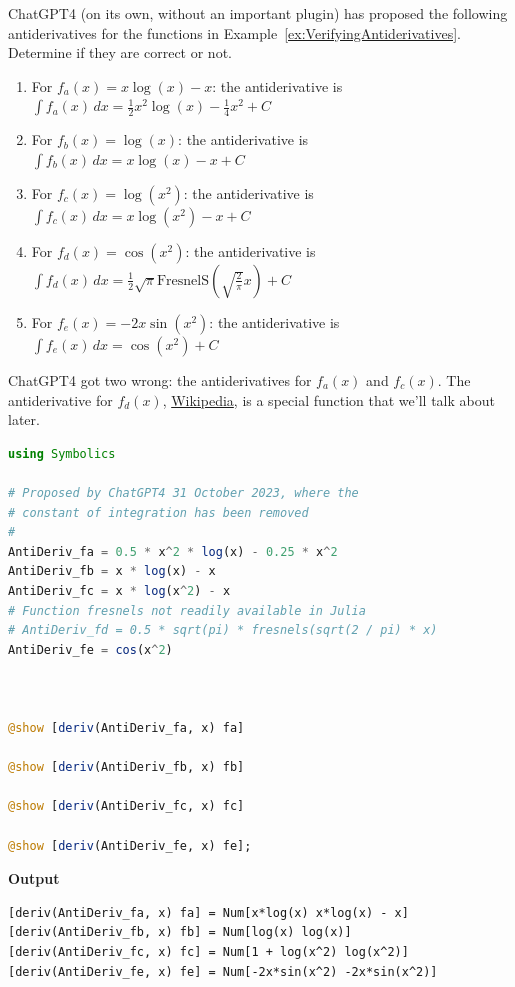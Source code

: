 \begin{example} 
\label{ex:ChatGPTWrongAntiderivatives}

ChatGPT4 (on its own, without an important plugin) has proposed the following antiderivatives for the functions in Example~\ref{ex:VerifyingAntiderivatives}. Determine if they are correct or not.

\begin{enumerate}
\renewcommand{\labelenumi}{(\alph{enumi})}
\setlength{\itemsep}{.2cm} 
\item For \( f_a(x) = x \log(x) - x \):  the antiderivative is \(\int f_a(x) \, dx = \frac{1}{2} x^2 \log(x) - \frac{1}{4} x^2 + C \)

\item For \( f_b(x) = \log(x) \):  the antiderivative is \(\int f_b(x) \, dx = x \log(x) - x + C \)

\item For \( f_c(x) = \log(x^2) \):  the antiderivative is \(\int f_c(x) \, dx = x \log(x^2) - x + C \)

\item For \( f_d(x) = \cos(x^2) \):  the antiderivative is \(\int f_d(x) \, dx = \frac{1}{2} \sqrt{\pi} \text{FresnelS}\left(\sqrt{\frac{2}{\pi}} x\right) + C \)

\item For \( f_e(x) = -2x \sin(x^2) \):  the antiderivative is \(\int f_e(x) \, dx = \cos(x^2) + C \)
\end{enumerate}
\end{example}

\solution ChatGPT4 got two wrong: the antiderivatives for $f_a(x)$ and $f_c(x)$. The antiderivative for $f_d(x)$, \href{https://en.wikipedia.org/wiki/Fresnel_integral}{Wikipedia}, is a special function that we'll talk about later. 

\begin{lstlisting}[language=Julia,style=mystyle]
using Symbolics 

# Proposed by ChatGPT4 31 October 2023, where the 
# constant of integration has been removed
#
AntiDeriv_fa = 0.5 * x^2 * log(x) - 0.25 * x^2
AntiDeriv_fb = x * log(x) - x
AntiDeriv_fc = x * log(x^2) - x
# Function fresnels not readily available in Julia
# AntiDeriv_fd = 0.5 * sqrt(pi) * fresnels(sqrt(2 / pi) * x)
AntiDeriv_fe = cos(x^2)



@show [deriv(AntiDeriv_fa, x) fa]

@show [deriv(AntiDeriv_fb, x) fb]

@show [deriv(AntiDeriv_fc, x) fc]

@show [deriv(AntiDeriv_fe, x) fe];
\end{lstlisting}
\textbf{Output} 
\begin{verbatim}
[deriv(AntiDeriv_fa, x) fa] = Num[x*log(x) x*log(x) - x]
[deriv(AntiDeriv_fb, x) fb] = Num[log(x) log(x)]
[deriv(AntiDeriv_fc, x) fc] = Num[1 + log(x^2) log(x^2)]
[deriv(AntiDeriv_fe, x) fe] = Num[-2x*sin(x^2) -2x*sin(x^2)]
\end{verbatim}

